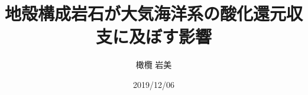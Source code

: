 \documentclass[a4paper,uplatex,dvipdfmx]{jsarticle}
\title{地殻構成岩石が大気海洋系の酸化還元収支に及ぼす影響}
\author{橄欖 岩美}
\date{2019/12/06}
\begin{document}
\begin{titlepage}
\thispagestyle{empty}
\epmaketitle
\end{titlepage}
\end{document}
